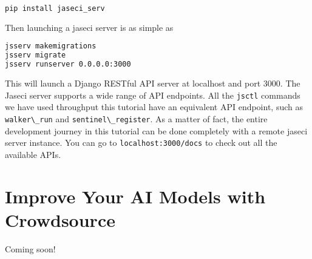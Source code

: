 \begin{lstlisting}[language=bash]
pip install jaseci_serv
\end{lstlisting}

Then launching a jaseci server is as simple as

\begin{lstlisting}[language=bash]
jsserv makemigrations
jsserv migrate
jsserv runserver 0.0.0.0:3000
\end{lstlisting}

This will launch a Django RESTful API server at localhost and port 3000.
The Jaseci server supports a wide range of API endpoints. All the
\passthrough{\lstinline!jsctl!} commands we have used throughput this
tutorial have an equivalent API endpoint, such as
\passthrough{\lstinline!walker\_run!} and
\passthrough{\lstinline!sentinel\_register!}. As a matter of fact, the
entire development journey in this tutorial can be done completely with
a remote jaseci server instance. You can go to
\passthrough{\lstinline!localhost:3000/docs!} to check out all the
available APIs.

\hypertarget{improve-your-ai-models-with-crowdsource}{%
\section{Improve Your AI Models with
Crowdsource}\label{improve-your-ai-models-with-crowdsource}}

Coming soon!
